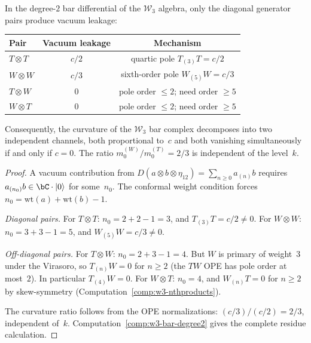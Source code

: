 \begin{proposition}
\label{prop:w3-vacuum-dichotomy}
In the degree-$2$ bar differential of the $\mathcal{W}_3$ algebra,
only the diagonal generator pairs produce vacuum leakage:
\begin{center}
\renewcommand{\arraystretch}{1.2}
\begin{tabular}{lcc}
\textbf{Pair} & \textbf{Vacuum leakage} & \textbf{Mechanism} \\
\hline
$T \otimes T$ & $c/2$ & quartic pole $T_{(3)}T = c/2$ \\
$W \otimes W$ & $c/3$ & sixth-order pole $W_{(5)}W = c/3$ \\
$T \otimes W$ & $0$ & pole order $\leq 2$; need order $\geq 5$ \\
$W \otimes T$ & $0$ & pole order $\leq 2$; need order $\geq 5$
\end{tabular}
\end{center}
Consequently, the curvature of the $\mathcal{W}_3$ bar complex decomposes
into two independent channels, both proportional to~$c$ and both vanishing
simultaneously if and only if $c = 0$.
The ratio $m_0^{(W)}/m_0^{(T)} = 2/3$ is independent of the level~$k$.
\end{proposition}

\begin{proof}
A vacuum contribution from $D(a \otimes b \otimes \eta_{12})
= \sum_{n \geq 0} a_{(n)}b$ requires $a_{(n_0)}b \in \bC \cdot |0\rangle$
for some~$n_0$. The conformal weight condition forces
$n_0 = \mathrm{wt}(a) + \mathrm{wt}(b) - 1$.

\emph{Diagonal pairs.}
For $T \otimes T$: $n_0 = 2 + 2 - 1 = 3$, and $T_{(3)}T = c/2 \neq 0$.
For $W \otimes W$: $n_0 = 3 + 3 - 1 = 5$, and $W_{(5)}W = c/3 \neq 0$.

\emph{Off-diagonal pairs.}
For $T \otimes W$: $n_0 = 2 + 3 - 1 = 4$. But $W$ is primary of
weight~$3$ under the Virasoro, so $T_{(n)}W = 0$ for $n \geq 2$
(the $TW$ OPE has pole order at most~$2$). In particular $T_{(4)}W = 0$.
For $W \otimes T$: $n_0 = 4$, and $W_{(n)}T = 0$ for $n \geq 2$ by
skew-symmetry (Computation~\ref{comp:w3-nthproducts}).

The curvature ratio follows from the OPE normalizations:
$(c/3)/(c/2) = 2/3$, independent of~$k$.
Computation~\ref{comp:w3-bar-degree2} gives the complete residue calculation.
\end{proof}

